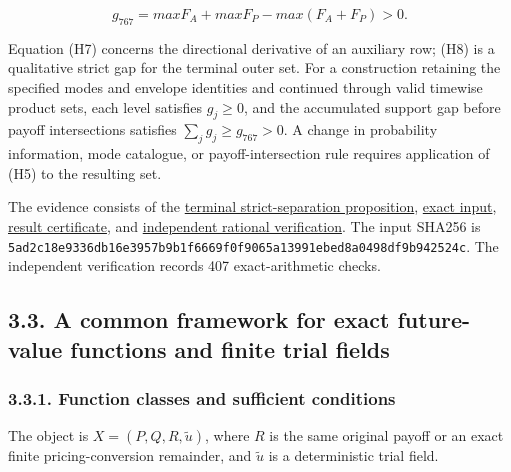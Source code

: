 \documentclass[a4paper,11pt]{article}
\begin{document}
\[
g_{767}=max F_A+max F_P-max(F_A+F_P)>0.
\tag{H8}
\]

Equation (H7) concerns the directional derivative of an auxiliary row; (H8) is a qualitative strict gap for the terminal outer set. For a construction retaining the specified modes and envelope identities and continued through valid timewise product sets, each level satisfies $g_j\ge0$, and the accumulated support gap before payoff intersections satisfies $\sum_jg_j\ge g_{767}>0$. A change in probability information, mode catalogue, or payoff-intersection rule requires application of (H5) to the resulting set.

The evidence consists of the \href{../docs/classical-evidence.md}{terminal strict-separation proposition}, \href{../code/classical/terminal767-input.json}{exact input}, \href{../code/classical/terminal767-result.json}{result certificate}, and \href{../code/classical/terminal767-historical-review.json}{independent rational verification}. The input SHA256 is \texttt{5ad2c18e9336db16e3957b9b1f6669f0f9065a13991ebed8a0498df9b942524c}. The independent verification records 407 exact-arithmetic checks.

\subsection*{3.3. A common framework for exact future-value functions and finite trial fields}

\subsubsection*{3.3.1. Function classes and sufficient conditions}

The object is $X=(P,Q,R,\widetilde u)$, where $R$ is the same original payoff or an exact finite pricing-conversion remainder, and $\widetilde u$ is a deterministic trial field.
\end{document}
